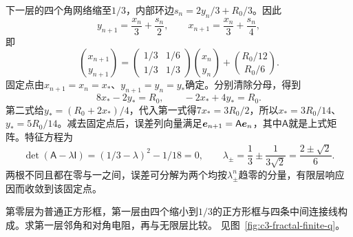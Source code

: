下一层的四个角网络缩至$1/3$，内部环边$s_n=2y_n/3+R_0/3$。因此
\[
 y_{n+1}=\frac{x_n}3+\frac{s_n}2,\qquad
 x_{n+1}=\frac{x_n}3+\frac{s_n}4,
\]
即
\[
 \binom{x_{n+1}}{y_{n+1}}
 =\begin{pmatrix}1/3&1/6\\1/3&1/3\end{pmatrix}
 \binom{x_n}{y_n}+\binom{R_0/12}{R_0/6}.
\]
固定点由$x_{n+1}=x_n=x_*$、$y_{n+1}=y_n=y_*$确定。分别清除分母，得到
\[8x_*-2y_*=R_0,\qquad -2x_*+4y_*=R_0.\]
第二式给$y_*=(R_0+2x_*)/4$，代入第一式得$7x_*=3R_0/2$，所以$x_*=3R_0/14$、$y_*=5R_0/14$。减去固定点后，误差列向量满足$\bm{e}_{n+1}=\mathsf A\bm{e}_n$，其中$\mathsf A$就是上式矩阵。特征方程为
\[\det(\mathsf A-\lambda\mathsf I)
=(1/3-\lambda)^2-1/18=0,\qquad
\lambda_\pm=\frac13\pm\frac1{3\sqrt2}=\frac{2\pm\sqrt2}{6}.\]
两根不同且都在零与一之间，误差可分解为两个均按$\lambda_\pm^n$趋零的分量，有限层响应因而收敛到该固定点。

\begin{example}[第一层分形的实际电阻]\label{ex:c3-fractal-finite}
第零层为普通正方形框，第一层由四个缩小到$1/3$的正方形框与四条中间连接线构成。求第一层邻角和对角电阻，再与无限层比较。 见图~\ref{fig:c3-fractal-finite-q}。
\end{example}

